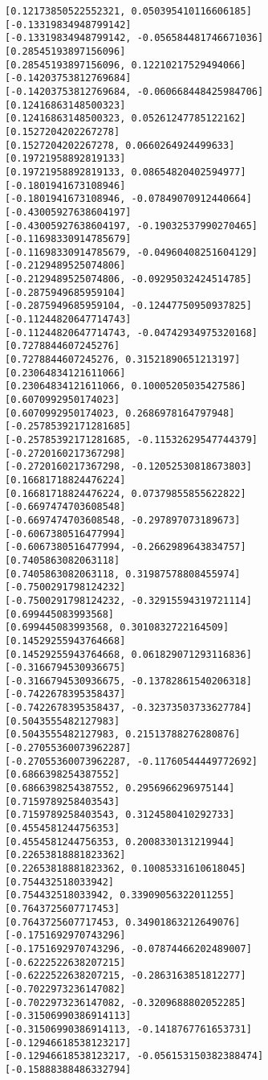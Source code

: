 \documentclass[11pt]{article}
\begin{document}
\begin{Verbatim}[commandchars=\\\{\}]
[0.12173850522552321, 0.050395410116606185]
[-0.13319834948799142]
[-0.13319834948799142, -0.056584481746671036]
[0.28545193897156096]
[0.28545193897156096, 0.12210217529494066]
[-0.14203753812769684]
[-0.14203753812769684, -0.060668448425984706]
[0.12416863148500323]
[0.12416863148500323, 0.05261247785122162]
[0.1527204202267278]
[0.1527204202267278, 0.0660264924499633]
[0.19721958892819133]
[0.19721958892819133, 0.08654820402594977]
[-0.1801941673108946]
[-0.1801941673108946, -0.07849070912440664]
[-0.43005927638604197]
[-0.43005927638604197, -0.19032537990270465]
[-0.11698330914785679]
[-0.11698330914785679, -0.04960408251604129]
[-0.2129489525074806]
[-0.2129489525074806, -0.09295032424514785]
[-0.2875949685959104]
[-0.2875949685959104, -0.12447750950937825]
[-0.11244820647714743]
[-0.11244820647714743, -0.04742934975320168]
[0.7278844607245276]
[0.7278844607245276, 0.31521890651213197]
[0.23064834121611066]
[0.23064834121611066, 0.10005205035427586]
[0.6070992950174023]
[0.6070992950174023, 0.2686978164797948]
[-0.25785392171281685]
[-0.25785392171281685, -0.11532629547744379]
[-0.2720160217367298]
[-0.2720160217367298, -0.12052530818673803]
[0.16681718824476224]
[0.16681718824476224, 0.07379855855622822]
[-0.6697474703608548]
[-0.6697474703608548, -0.297897073189673]
[-0.6067380516477994]
[-0.6067380516477994, -0.2662989643834757]
[0.7405863082063118]
[0.7405863082063118, 0.31987578808455974]
[-0.7500291798124232]
[-0.7500291798124232, -0.32915594319721114]
[0.699445083993568]
[0.699445083993568, 0.3010832722164509]
[0.14529255943764668]
[0.14529255943764668, 0.061829071293116836]
[-0.3166794530936675]
[-0.3166794530936675, -0.13782861540206318]
[-0.7422678395358437]
[-0.7422678395358437, -0.32373503733627784]
[0.5043555482127983]
[0.5043555482127983, 0.21513788276280876]
[-0.27055360073962287]
[-0.27055360073962287, -0.11760544449772692]
[0.6866398254387552]
[0.6866398254387552, 0.2956966296975144]
[0.7159789258403543]
[0.7159789258403543, 0.3124580410292733]
[0.4554581244756353]
[0.4554581244756353, 0.2008330131219944]
[0.22653818881823362]
[0.22653818881823362, 0.10085331610618045]
[0.754432518033942]
[0.754432518033942, 0.33909056322011255]
[0.7643725607717453]
[0.7643725607717453, 0.34901863212649076]
[-0.1751692970743296]
[-0.1751692970743296, -0.07874466202489007]
[-0.6222522638207215]
[-0.6222522638207215, -0.2863163851812277]
[-0.7022973236147082]
[-0.7022973236147082, -0.3209688802052285]
[-0.31506990386914113]
[-0.31506990386914113, -0.1418767761653731]
[-0.12946618538123217]
[-0.12946618538123217, -0.056153150382388474]
[-0.15888388486332794]

\end{Verbatim}
\end{document}
